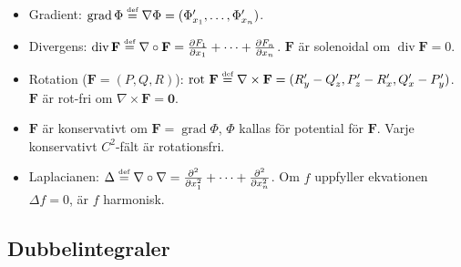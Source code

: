 \documentclass{article}
\newcommand\dd[2]{\frac{\partial #1}{\partial #2}}
\newcommand\bdF{\mathbf F}
\newcommand\bdzero{\mathbf 0}
\def\Rone{{\mathbb R}}
\def\Grad{\mathop{\mathrm{grad}}}
\def\Rot{\mathop{\mathrm{rot}}}
\newcommand\Div{\mathop{\mathrm{div}}}
\begin{document}
\begin{itemize}

   \item Gradient: %
     $\Grad \Phi \stackrel{\mbox{\tiny def}}
     {=} \nabla\Phi = (\Phi'_{x_1},\ldots,\Phi'_{x_n})$.
   \item %
        {Divergens:}
     $\Div \bdF \stackrel{\mbox{\tiny def}}
     {=} \nabla\circ\bdF = \textstyle\dd{F_1}{x_1}+\cdots+\dd{F_n}{x_n}$.
        $\bdF$ 
           {är solenoidal om}
    $\Div \bdF=0$.
   \item %
     \Tr{Curl (in $\Rone^3$, $\bdF=(P,Q,R)$):}
        {Rotation ($\bdF=(P,Q,R)$):}
     $\Rot\,\bdF \stackrel{\mbox{\tiny def}}
        {=} \nabla\times\bdF = (R'_y-Q'_z,P'_z-R'_x,Q'_x-P'_y)$.
        $\bdF$
           {är rot-fri om}
        $\nabla\times\bdF=\bdzero$.
   \item %
   $\bdF$
      {är konservativt om}
   $\bdF=\Grad\Phi$, $\Phi$
      {kallas för potential för}
   $\bdF$.
      {Varje konservativt $C^2$-fält är rotationsfri}.
   \item %
        {Laplacianen:}
 $\Delta\stackrel{\mbox{\tiny def}}
 =\nabla\circ\nabla=\dd {{}^2}{x_1^2}+\cdots+\dd {{}^2}{x_n^2}$.
    {Om}
 $f$
    {uppfyller ekvationen}
 $\Delta f=0$, 
    {är}
 $f$
    {harmonisk.}

\end{itemize}

\subsection*{
   {Dubbelintegraler}
}
\end{document}
